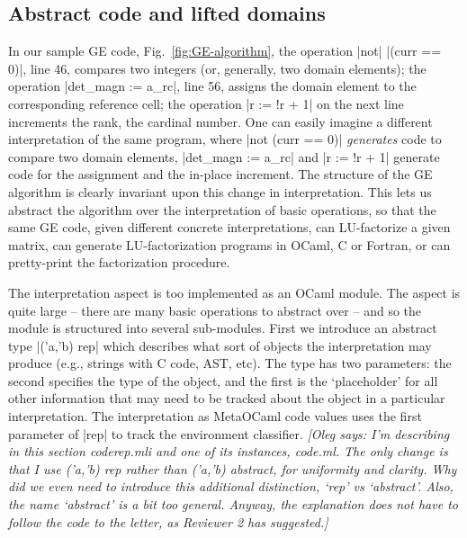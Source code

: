 \documentclass{elsart}
\newcommand{\oleg}[1]{{\it [Oleg says: #1]}}
\begin{document}
\subsection{Abstract code and lifted domains}\label{sec:lifteddomains}

In our sample GE code, Fig.~\ref{fig:GE-algorithm}, the operation |not|
|(curr == 0)|, line 46, compares two integers (or, generally, two
domain elements); the operation |det_magn := a_rc|, line 56, assigns
the domain element to the corresponding reference cell; the operation
|r := !r + 1| on the next line increments the rank, the cardinal
number. One can easily imagine a different interpretation of the same
program, where |not (curr == 0)| \emph{generates} code to compare two
domain elements, |det_magn := a_rc| and |r := !r + 1| generate code
for the assignment and the in-place increment. The structure of the GE
algorithm is clearly invariant upon this change in
interpretation. This lets us abstract the algorithm over the
interpretation of basic operations, so that the same GE code, given
different concrete interpretations, can LU-factorize a given matrix,
can generate LU-factorization programs in OCaml, C or Fortran, or can
pretty-print the factorization procedure.

The interpretation aspect is too implemented as an OCaml module.  The
aspect is quite large -- there are many basic operations to abstract
over -- and so the module is structured into several
sub-modules. First we introduce an abstract type |('a,'b) rep| which
describes what sort of objects the interpretation may produce (e.g.,
strings with C code, AST, etc). The type has two parameters: the
second specifies the type of the object, and the first is the
`placeholder' for all other information that may need to be tracked
about the object in a particular interpretation. The interpretation as
MetaOCaml code values uses the first parameter of |rep| to track the
environment classifier.
\oleg{I'm describing in this section coderep.mli and one of its
  instances, code.ml. The only change is that I use ('a,'b) rep rather
  than ('a,'b) abstract, for uniformity and clarity. Why did we even
  need to introduce this additional distinction, `rep' vs
  `abstract'. Also, the name `abstract' is a bit too
  general. Anyway, the explanation does not have to follow the code to
  the letter, as Reviewer 2 has suggested.}
\end{document}
